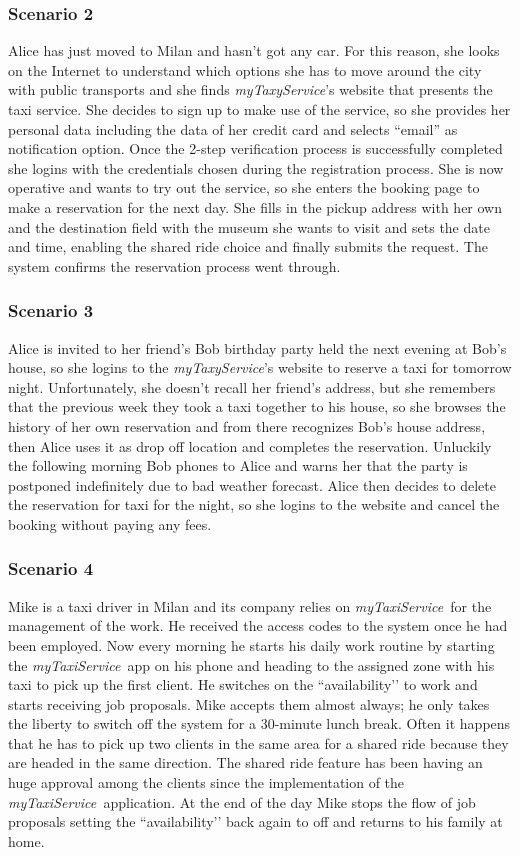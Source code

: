 \documentclass[a4paper,11pt]{report} %
\newcommand{\mts}{\mbox{\normalfont\itshape myTaxiService\ }}
\begin{document}
	\subsubsection{Scenario 2} Alice has just moved to Milan and hasn’t got any car. For this reason, she looks on the Internet to understand which options she has to move around the city with public transports and she finds {\em myTaxyService}'s website that presents the taxi service. She decides to sign up to make use of the service, so she provides her personal data including the data of her credit card and selects ``email'' as notification option. Once the 2-step verification process is successfully completed she logins with the credentials chosen during the registration process. She is now operative and wants to try out the service, so she enters the booking page to make a reservation for the next day. She fills in the pickup address with her own and the destination field with the museum she wants to visit and sets the date and time, enabling the shared ride choice and finally submits the request. The system confirms the reservation process went through. 
	
	\subsubsection{Scenario 3} Alice is invited to her friend’s Bob birthday party held the next evening at Bob’s house, so she logins to the {\em myTaxyService}'s website to reserve a taxi for tomorrow night. Unfortunately, she doesn’t recall her friend’s address, but she remembers that the previous week they took a taxi together to his house, so she browses the history of her own reservation and from there recognizes Bob’s house address, then Alice uses it as drop off location and completes the reservation. Unluckily the following morning Bob phones to Alice and warns her that the party is postponed indefinitely due to bad weather forecast. Alice then decides to delete the reservation for taxi for the night, so she logins to the website and cancel the booking without paying any fees.
	
	\subsubsection{Scenario 4} Mike is a taxi driver in Milan and its company relies on \mts for the management of the work. He received the access codes to the system once he had been employed. Now every morning he starts his daily work routine by starting the \mts app on his phone and heading to the assigned zone with his taxi to pick up the first client. He switches on the ``availability’’ to work and starts receiving job proposals. Mike accepts them almost always; he only takes the liberty to switch off the system for a 30-minute lunch break. Often it happens that he has to pick up two clients in the same area for a shared ride because they are headed in the same direction. The shared ride feature has been having an huge approval among the clients since the implementation of the \mts application. At the end of the day Mike stops the flow of job proposals setting the ``availability’’ back again to off and returns to his family at home.
	
\end{document}
